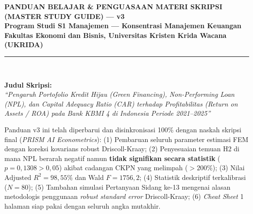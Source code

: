 \documentclass[11pt,a4paper]{article}
\begin{document}
\begin{center}
    \vspace*{0.5cm}
    {\Huge \textbf{\color{primaryBlue}PANDUAN BELAJAR \& PENGUASAAN MATERI SKRIPSI}}\\[0.3cm]
    {\Large \textbf{\color{secondaryBlue}(MASTER STUDY GUIDE) --- v3}}\\[0.2cm]
    {\normalsize \textbf{\color{darkText}Program Studi S1 Manajemen --- Konsentrasi Manajemen Keuangan}}\\[0.1cm]
    {\normalsize \textbf{\color{accentTeal}Fakultas Ekonomi dan Bisnis, Universitas Kristen Krida Wacana (UKRIDA)}}\\[0.6cm]
    \rule{\linewidth}{1.5pt}\\[0.4cm]
\end{center}

\begin{tcolorbox}[colback=lightBg, colframe=primaryBlue, arc=4pt, boxrule=1pt]
    \textbf{\color{primaryBlue}Judul Skripsi:}\\
    \textit{\large ``Pengaruh Portofolio Kredit Hijau (\textit{Green Financing}), \textit{Non-Performing Loan} (NPL), dan \textit{Capital Adequacy Ratio} (CAR) terhadap Profitabilitas (\textit{Return on Assets} / ROA) pada Bank KBMI 4 di Indonesia Periode 2021--2025''}
\end{tcolorbox}

\begin{tipbox}
    Panduan v3 ini telah diperbarui dan disinkronisasi 100\% dengan naskah skripsi final (\textit{PRISM AI Econometrics}):
    (1) Pembaruan seluruh parameter estimasi FEM dengan koreksi kovarians robust Driscoll-Kraay;
    (2) Penyesuaian temuan H2 di mana NPL berarah negatif namun \textbf{tidak signifikan secara statistik} ($p = 0{,}1308 > 0{,}05$) akibat cadangan CKPN yang melimpah ($> 200\%$);
    (3) Nilai $\text{Adjusted } R^2 = 98{,}55\%$ dan Wald $F = 1756{,}2$;
    (4) Statistik deskriptif terkalibrasi ($N=80$);
    (5) Tambahan simulasi Pertanyaan Sidang ke-13 mengenai alasan metodologis penggunaan \textit{robust standard error} Driscoll-Kraay;
    (6) \textit{Cheat Sheet} 1 halaman siap pakai dengan seluruh angka mutakhir.
\end{tipbox}
\end{document}
